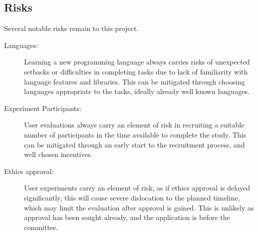 \subsection{Risks}

Several notable risks remain to this project.
\begin{description}
\item[Languages:] Learning a new programming language always carries risks of unexpected setbacks or difficulties in completing tasks due to lack of familiarity with language features and libraries. This can be mitigated through choosing languages appropriate to the tasks, ideally already well known languages. 
\item[Experiment Participants:] User evaluations always carry an element of risk in recruiting a suitable number of participants in the time available to complete the study. This can be mitigated through an early start to the recruitment process, and well chosen incentives. 
\item[Ethics approval:] User experiments carry an element of risk, as if ethics approval is delayed significantly, this will cause severe dislocation to the planned timeline, which may limit the evaluation after approval is gained. This is unlikely as approval has been sought already, and the application is before the committee.  
\end{description}
